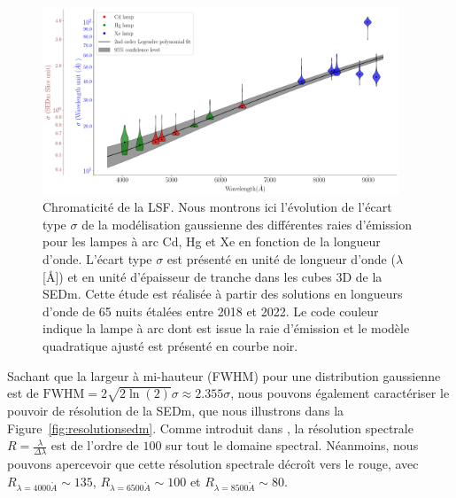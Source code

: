 \documentclass[../main/main.tex]{subfiles}
\begin{document}
\begin{figure}[h!]
  \centering
  \includegraphics[width=0.95\textwidth]{../figures/06_irf/LSF.pdf}
  \caption[Chromaticité de la LSF]{Chromaticité de la LSF. Nous montrons
  ici l'évolution de l'écart type $\sigma$ de la modélisation gaussienne
  des différentes raies
  d'émission pour les lampes à arc Cd, Hg et Xe en fonction de la
  longueur d'onde. L'écart type $\sigma$ est présenté en unité de
  longueur d'onde ($\lambda$[\AA]) et en unité d'épaisseur de tranche
  dans les cubes 3D de la SEDm. Cette étude est réalisée à partir des
  solutions en longueurs d'onde de 65 nuits étalées entre 2018 et
  2022. Le code couleur indique
la lampe à arc dont est issue la raie d'émission et le modèle quadratique
ajusté est présenté en courbe noir. }
  \label{fig:lsf}
\end{figure}

Sachant que la largeur à mi-hauteur (FWHM) pour une distribution
gaussienne est de $\text{FWHM}=2\sqrt{2\ln(2)}\sigma\approx2.355\sigma$, nous
pouvons également caractériser le pouvoir de résolution de la SEDm, que
nous illustrons dans la Figure~\ref{fig:resolutionsedm}.
Comme introduit dans \citet{SEDM18}, la résolution spectrale
$R=\frac{\lambda}{\Delta\lambda}$ est de l'ordre de $100$ sur tout le
domaine spectral. Néanmoins, nous pouvons apercevoir que cette
résolution spectrale décroît vers le rouge, avec
$R_{\lambda=4000\mathring{A}}\sim135$,
$R_{\lambda=6500\mathring{A}}\sim100$ et $R_{\lambda=8500\mathring{A}}\sim80$.\\
\end{document}
